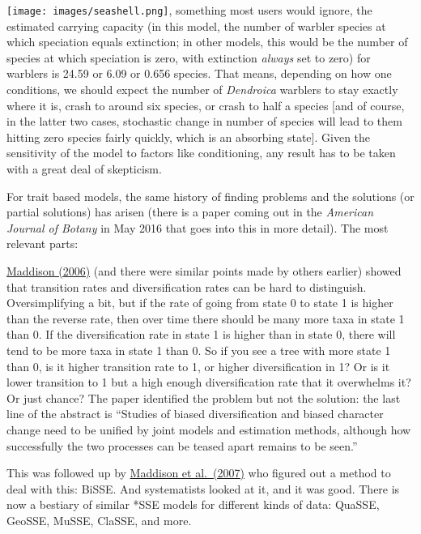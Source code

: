 \documentclass[
]{article}
\begin{document}
{  \texttt{[image: images/seashell.png]}}, something most users would ignore, the estimated carrying capacity (in this model, the number of warbler species at which speciation equals extinction; in other models, this would be the number of species at which speciation is zero, with extinction \emph{always} set to zero) for warblers is 24.59 or 6.09 or 0.656 species. That means, depending on how one conditions, we should expect the number of \emph{Dendroica} warblers to stay exactly where it is, crash to around six species, or crash to half a species {[}and of course, in the latter two cases, stochastic change in number of species will lead to them hitting zero species fairly quickly, which is an absorbing state{]}. Given the sensitivity of the model to factors like conditioning, any result has to be taken with a great deal of skepticism.

For trait based models, the same history of finding problems and the solutions (or partial solutions) has arisen (there is a paper coming out in the \emph{American Journal of Botany} in May 2016 that goes into this in more detail). The most relevant parts:

\href{http://onlinelibrary.wiley.com/doi/10.1111/j.0014-3820.2006.tb00517.x/abstract}{Maddison (2006)} (and there were similar points made by others earlier) showed that transition rates and diversification rates can be hard to distinguish. Oversimplifying a bit, but if the rate of going from state 0 to state 1 is higher than the reverse rate, then over time there should be many more taxa in state 1 than 0. If the diversification rate in state 1 is higher than in state 0, there will tend to be more taxa in state 1 than 0. So if you see a tree with more state 1 than 0, is it higher transition rate to 1, or higher diversification in 1? Or is it lower transition to 1 but a high enough diversification rate that it overwhelms it? Or just chance? The paper identified the problem but not the solution: the last line of the abstract is ``Studies of biased diversification and biased character change need to be unified by joint models and estimation methods, although how successfully the two processes can be teased apart remains to be seen.''

This was followed up by \href{http://sysbio.oxfordjournals.org/content/56/5/701.short}{Maddison et al.~(2007)} who figured out a method to deal with this: BiSSE. And systematists looked at it, and it was good. There is now a bestiary of similar *SSE models for different kinds of data: QuaSSE, GeoSSE, MuSSE, ClaSSE, and more.
\end{document}
